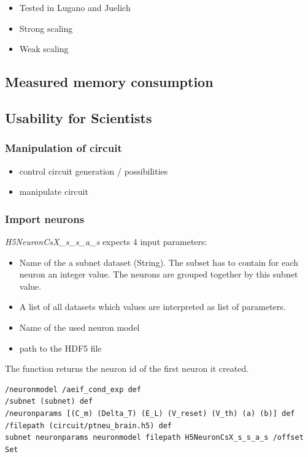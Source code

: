 \documentclass[a4paper]{article}
\begin{document}
\begin{itemize}
      \item Tested in Lugano and Juelich
      \item Strong scaling
      \item Weak scaling
\end{itemize}

\subsection{Measured memory consumption}

\newpage
\subsection{Usability for Scientists}

\subsubsection{Manipulation of circuit}

\begin{itemize}
      \item control circuit generation / possibilities
      \item  manipulate circuit
\end{itemize}

\subsubsection{Import neurons}
\emph{H5NeuronCsX\_s\_s\_a\_s} expects 4 input parameters:
\begin{itemize}
      \item Name of the a subnet dataset (String).
The subset has to contain for each neuron an integer value.
The neurons are grouped together by this subnet value.

      \item A list of all datasets which values are interpreted as list of parameters.
      
      \item Name of the used neuron model
      
      \item path to the HDF5 file 
\end{itemize}
The function returns the neuron id of the first neuron it created.

\begin{lstlisting}[label=sliNeurons,caption=Calling the neuron import module via H5NeuronCsX\_s\_s\_a\_s SLI command ]
/neuronmodel /aeif_cond_exp def
/subnet (subnet) def
/neuronparams [(C_m) (Delta_T) (E_L) (V_reset) (V_th) (a) (b)] def
/filepath (circuit/ptneu_brain.h5) def
subnet neuronparams neuronmodel filepath H5NeuronCsX_s_s_a_s /offset Set
\end{lstlisting}
\end{document}
